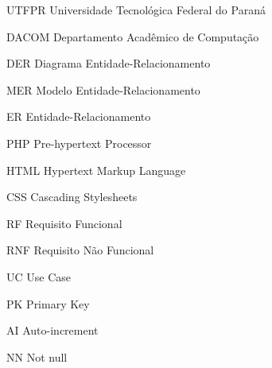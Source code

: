 
\begin{siglas}
    \item[UTFPR] Universidade Tecnológica Federal do Paraná
    \item[DACOM] Departamento Acadêmico de Computação
    \item[DER] Diagrama Entidade-Relacionamento
    \item[MER] Modelo Entidade-Relacionamento
    \item[ER] Entidade-Relacionamento
    \item[PHP] Pre-hypertext Processor
    \item[HTML] Hypertext Markup Language
    \item[CSS] Cascading Stylesheets
    \item[RF] Requisito Funcional 
    \item[RNF] Requisito Não Funcional 
    \item[UC] Use Case 
    \item[PK] Primary Key 
    \item[AI] Auto-increment 
    \item[NN] Not null 
\end{siglas}

